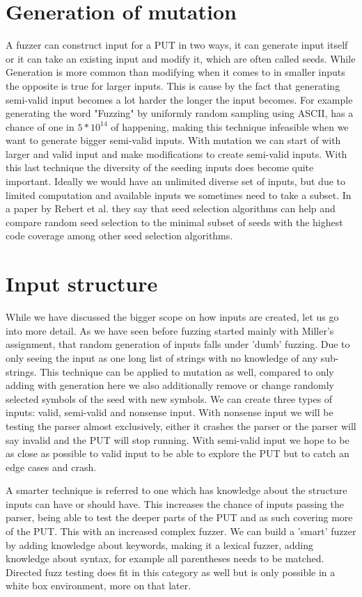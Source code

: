 \section{Generation of mutation}
A fuzzer can construct input for a PUT in two ways, it can generate input itself or it can take an existing input and modify it, which are often called seeds. While Generation is more common than modifying when it comes to in smaller inputs the opposite is true for larger inputs. This is cause by the fact that generating semi-valid input becomes a lot harder the longer the input becomes. For example generating the word "Fuzzing" by uniformly random sampling using ASCII, has a chance of one in $5*10^{14}$ of happening, making this technique infeasible when we want to generate bigger semi-valid inputs. With mutation we can start of with larger and valid input and make modifications to create semi-valid inputs. With this last technique the diversity of the seeding inputs does become quite important. Ideally we would have an unlimited diverse set of inputs, but due to limited computation and available inputs we sometimes need to take a subset. In a paper by Rebert et al. \cite{14rebert2014seedselecting} they say that seed selection algorithms can help and compare random seed selection to the minimal subset of seeds with the highest code coverage among other seed selection algorithms. 

\section{Input structure}
While we have discussed the bigger scope on how inputs are created, let us go into more detail. As we have seen before fuzzing started mainly with Miller's assignment, that random generation of inputs falls under 'dumb' fuzzing. Due to only seeing the input as one long list of strings with no knowledge of any sub-strings. This technique can be applied to mutation as well, compared to only adding with generation here we also additionally remove or change randomly selected symbols of the seed with new symbols. 
We can create three types of inputs: valid, semi-valid and nonsense input. With nonsense input we will be testing the parser almost exclusively, either it crashes the parser or the parser will say invalid and the PUT will stop running. With semi-valid input we hope to be as close as possible to valid input to be able to explore the PUT but to catch an edge cases and crash.

A smarter technique is referred to one which has knowledge about the structure inputs can have or should have. This increases the chance of inputs passing the parser, being able to test the deeper parts of the PUT and as such covering more of the PUT. This with an increased complex fuzzer. We can build a 'smart' fuzzer by adding knowledge about keywords, making it a lexical fuzzer, adding knowledge about syntax, for example all parentheses needs to be matched. Directed fuzz testing does fit in this category as well but is only possible in a white box environment, more on that later.

